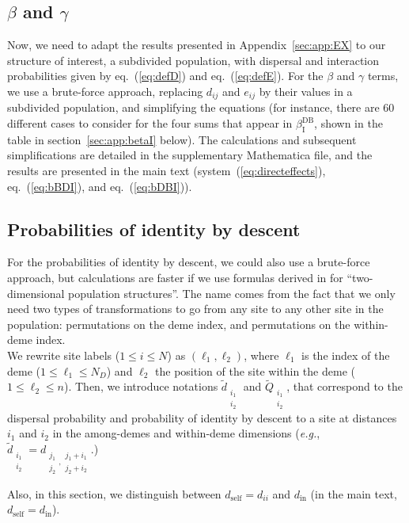 \documentclass[11pt, letterpaper]{article}
\renewcommand{\eqref}[1]{\textup{{\normalfont eq.~(\ref{#1}}\normalfont)}}
\newcommand{\sysref}[1]{system~(\ref{#1})}
\newcommand{\eg}{\textit{e.g.}}
\newcommand{\appname}[0]{Appendix}
\newcommand{\indirect}{\mathrm{I}}
\newcommand{\DB}{\textrm{DB}}
\newcommand{\self}{\textrm{self}}
\newcommand{\inn}{\textrm{in}}
\newcommand{\din}{d_{\inn}}
\newcommand{\dself}{d_{\self}}
\newcommand{\ndemes}{N_D}
\begin{document}
\subsection{\label{sec:app:bcsubdiv}$\beta$ and $\gamma$}
Now, we need to adapt the results presented in \appname~\ref{sec:app:EX} to our structure of interest, a subdivided population, with dispersal and interaction probabilities given by \eqref{eq:defD} and \eqref{eq:defE}. For the $\beta$ and $\gamma$ terms, we use a brute-force approach, replacing $d_{ij}$ and $e_{ij}$ by their values in a subdivided population, and simplifying the equations (for instance, there are $60$ different cases to consider for the four sums that appear in $\beta_{\indirect}^{\DB}$, shown in the table in section~\ref{sec:app:betaI} below). The calculations and subsequent simplifications are detailed in the supplementary Mathematica file, and the results are presented in the main text (\sysref{eq:directeffects}, \eqref{eq:bBDI}, and \eqref{eq:bDBI}). 

\subsection{\label{sec:app:Qsubdiv}Probabilities of identity by descent}
For the probabilities of identity by descent, we could also use a brute-force approach, but calculations are faster if we use formulas derived in \citet{Debarre2017} for ``two-dimensional population structures''. The name comes from the fact that we only need two types of transformations to go from any site to any other site in the population: permutations on the deme index, and permutations on the within-deme index.  \\
%
We rewrite site labels ($1\leq i \leq N$) as $(\ell_1, \ell_2)$, where $\ell_1$ is the index of the deme ($1\leq \ell_1 \leq \ndemes$) and $\ell_2$ the position of the site within the deme ($1\leq \ell_2 \leq n$). Then, we introduce notations $\tilde{d}_{\substack{i_1\\i_2}}$ and $\tilde{Q}_{\substack{i_1\\i_2}}$, that correspond to the dispersal probability and probability of identity by descent to a site at distances $i_1$ and $i_2$ in the among-demes and within-deme dimensions (\eg, $\tilde{d}_{\substack{i_1\\i_2}} = d_{\substack{j_1\\j_2}, \substack{j_1+i_1\\j_2+i_2}}$.) 

Also, in this section, we distinguish between $\dself = d_{ii}$ and $\din$ (in the main text, $\dself = \din$). 
\end{document}
